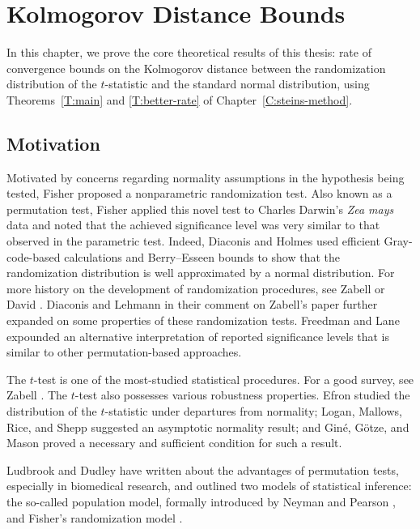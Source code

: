 \chapter{Kolmogorov Distance Bounds}
\label{C:stein-proof} In this chapter, we prove the core theoretical
results of this thesis: rate of convergence bounds on the Kolmogorov
distance between the randomization distribution of the $t$-statistic
and the standard normal distribution, using
Theorems~\ref{T:main} and \ref{T:better-rate} of Chapter~\ref{C:steins-method}.

\section{Motivation}
Motivated by concerns regarding normality assumptions in the
hypothesis being tested, Fisher \cite{fisher1935design} proposed a
nonparametric randomization test.  Also known as a permutation test,
Fisher applied this novel test to Charles Darwin's \emph{Zea mays}
data and noted that the achieved significance level was very similar
to that observed in the parametric test.  Indeed, Diaconis and Holmes
\cite{diaconis1994gray} used efficient Gray-code-based calculations
and Berry--Esseen bounds to show that the randomization distribution
is well approximated by a normal distribution.  For more history on
the development of randomization procedures, see Zabell
\cite{zabell2008student} or David \cite{david2008beginnings}.
Diaconis and Lehmann \cite{diaconis2008comment} in their comment on
Zabell's paper further expanded on some properties of these
randomization tests.  Freedman and Lane
\cite{freedman1983nonstochastic} expounded an alternative
interpretation of reported significance levels that is similar to
other permutation-based approaches.

The $t$-test is one of the most-studied statistical procedures.  For a
good survey, see Zabell \cite{zabell2008student}.  The $t$-test also
possesses various robustness properties.  Efron \cite{efron1969student}
studied the distribution of the $t$-statistic under departures from
normality; Logan, Mallows, Rice, and Shepp \cite{MR0362449} suggested
an asymptotic normality result; and Gin\'e, G\"otze, and Mason \cite{MR1457629}
proved a necessary and sufficient condition for such a result.

Ludbrook and Dudley \cite{ludbrook1998permutation} have written about
the advantages of permutation tests, especially in biomedical
research, and outlined two models of statistical inference: the
so-called population model, formally introduced by Neyman and Pearson
\cite{neyman1928use}, and Fisher's randomization model
\cite{fisher1935design}.


